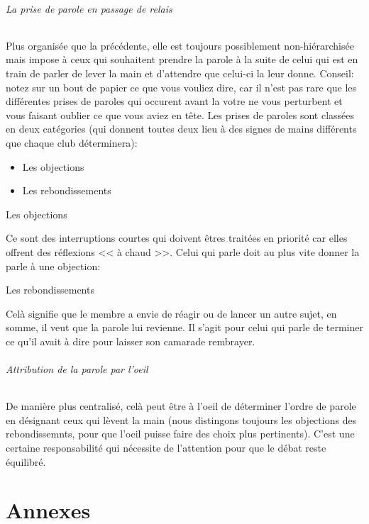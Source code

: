 \documentclass[a4paper,12pt]{article}
\begin{document}
\paragraph{La prise de parole en passage de relais}
Plus organisée que la précédente, elle est toujours possiblement non-hiérarchisée mais impose à ceux qui souhaitent prendre la parole à la suite de celui qui est en train de parler de lever la main et d'attendre que celui-ci la leur donne. Conseil: notez sur un bout de papier ce que vous vouliez dire, car il n'est pas rare que les différentes prises de paroles qui occurent avant la votre ne vous perturbent et vous faisant oublier ce que vous aviez en tête. Les prises de paroles sont classées en deux catégories (qui donnent toutes deux lieu à des signes de mains différents que chaque club déterminera):
\begin{itemize}
 \item Les objections
 \item Les rebondissements
\end{itemize}
\subparagraph{Les objections}
Ce sont des interruptions courtes qui doivent êtres traitées en priorité car elles offrent des réflexions << à chaud >>. Celui qui parle doit au plus vite donner la parle à une objection:
\subparagraph{Les rebondissements}
Celà signifie que le membre a envie de réagir ou de lancer un autre sujet, en somme, il veut que la parole lui revienne. Il s'agit pour celui qui parle de terminer ce qu'il avait à dire pour laisser son camarade rembrayer.
\paragraph{Attribution de la parole par l'oeil}
De manière plus centralisé, celà peut être à l'oeil de déterminer l'ordre de parole en désignant ceux qui lèvent la main (nous distingons toujours les objections des rebondissemnts, pour que l'oeil puisse faire des choix plus pertinents). C'est une certaine responsabilité qui nécessite de l'attention pour que le débat reste équilibré.




\part{Annexes}
\end{document}

